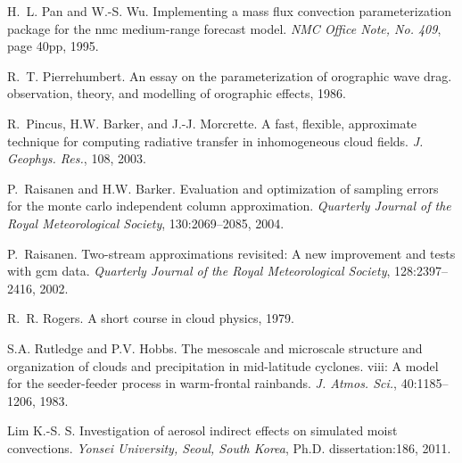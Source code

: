 \begin{DoxyDescription}
\item[\label{_CITEREF_pan_and_wu_1995}%
\mbox{[}48\mbox{]}]H.~L. Pan and W.-\/S. Wu. Implementing a mass flux convection parameterization package for the nmc medium-\/range forecast model. {\itshape N\+MC Office Note, No. 409}, page 40pp, 1995.


\item[\label{_CITEREF_pierrehumbert_1987}%
\mbox{[}49\mbox{]}]R.~T. Pierrehumbert. An essay on the parameterization of orographic wave drag. observation, theory, and modelling of orographic effects, 1986.


\item[\label{_CITEREF_pincus_et_al_2003}%
\mbox{[}50\mbox{]}]R.~Pincus, H.\+W. Barker, and J.-\/J. Morcrette. A fast, flexible, approximate technique for computing radiative transfer in inhomogeneous cloud fields. {\itshape J. Geophys. Res.}, 108, 2003.


\item[\label{_CITEREF_raisanen_and_barker_2004}%
\mbox{[}51\mbox{]}]P.~Raisanen and H.\+W. Barker. Evaluation and optimization of sampling errors for the monte carlo independent column approximation. {\itshape Quarterly Journal of the Royal Meteorological Society}, 130\+:2069--2085, 2004.


\item[\label{_CITEREF_raisanen_2002}%
\mbox{[}52\mbox{]}]P.~Raisanen. Two-\/stream approximations revisited\+: A new improvement and tests with gcm data. {\itshape Quarterly Journal of the Royal Meteorological Society}, 128\+:2397--2416, 2002.


\item[\label{_CITEREF_rogers_1979}%
\mbox{[}53\mbox{]}]R.~R. Rogers. A short course in cloud physics, 1979.


\item[\label{_CITEREF_rutledge_and_hobbs_1983}%
\mbox{[}54\mbox{]}]S.\+A. Rutledge and P.\+V. Hobbs. The mesoscale and microscale structure and organization of clouds and precipitation in mid-\/latitude cyclones. viii\+: A model for the \textquotesingle{}seeder-\/feeder\textquotesingle{} process in warm-\/frontal rainbands. {\itshape J. Atmos. Sci.}, 40\+:1185--1206, 1983.


\item[\label{_CITEREF_lim_2011}%
\mbox{[}55\mbox{]}]Lim K.-\/S. S. Investigation of aerosol indirect effects on simulated moist convections. {\itshape Yonsei University, Seoul, South Korea}, Ph.\+D. dissertation\+:186, 2011.



\end{DoxyDescription}
